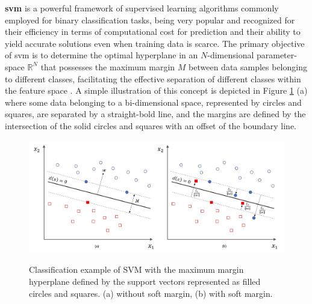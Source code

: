 \textbf{\gls{svm}} is a powerful framework of supervised learning algorithms commonly employed for binary classification tasks, being very popular and recognized for their efficiency in terms of computational cost for prediction and their ability to yield accurate solutions even when training data is scarce. The primary objective of \gls{svm} is to determine the optimal hyperplane in an $N$-dimensional parameter-space $\mathbb{R}^N$ that possesses the maximum margin $M$ between data samples belonging to different classes, facilitating the effective separation of different classes within the feature space \cite{Russel2010}. A simple illustration of this concept is depicted in Figure \ref{fig:frmwk_machine_learning_svm} (a) where some data belonging to a bi-dimensional space, represented by circles and squares, are separated by a straight-bold line, and the margins are defined by the intersection of the solid circles and squares with an offset of the boundary line.



\begin{figure}[htbp]
    \raggedright
        \caption{Classification example of SVM with the maximum margin hyperplane defined by the support vectors represented as filled circles and squares. (a) without soft margin, (b) with soft margin.}
        \includegraphics[width=1.0\textwidth]{resources/images/030-theoretical_framework/Framework_machine_learning_SVM.png}
        \label{fig:frmwk_machine_learning_svm}
\end{figure}

